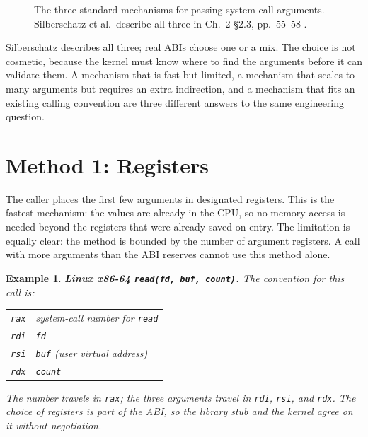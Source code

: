 \documentclass[11pt]{article}
\newtheorem{example}{Example}
\begin{document}
\begin{figure}[h]
\centering
{}
\caption{The three standard mechanisms for passing system-call arguments.
Silberschatz et al.\ describe all three in Ch.~2 \S2.3, pp.~55--58
\cite{SilberschatzOSC_operating_system_concepts}.}
\label{fig:three-ways}
\end{figure}

Silberschatz describes all three; real ABIs choose one or a mix. The choice is
not cosmetic, because the kernel must know where to find the arguments before
it can validate them. A mechanism that is fast but limited, a mechanism that
scales to many arguments but requires an extra indirection, and a mechanism
that fits an existing calling convention are three different answers to the
same engineering question.

\section{Method 1: Registers}

The caller places the first few arguments in designated registers. This is the
fastest mechanism: the values are already in the CPU, so no memory access is
needed beyond the registers that were already saved on entry. The limitation is
equally clear: the method is bounded by the number of argument registers. A
call with more arguments than the ABI reserves cannot use this method alone.

\begin{example}
\textup{\textbf{Linux x86-64 \texttt{read(fd, buf, count)}.}} The convention for this
call is:
\begin{center}
\begin{tabular}{@{}ll@{}}
\texttt{rax} & system-call number for \texttt{read} \\
\texttt{rdi} & \texttt{fd} \\
\texttt{rsi} & \texttt{buf} (user virtual address) \\
\texttt{rdx} & \texttt{count} \\
\end{tabular}
\end{center}
The number travels in \texttt{rax}; the three arguments travel in \texttt{rdi},
\texttt{rsi}, and \texttt{rdx}. The choice of registers is part of the ABI, so
the library stub and the kernel agree on it without negotiation.
\end{example}
\end{document}

